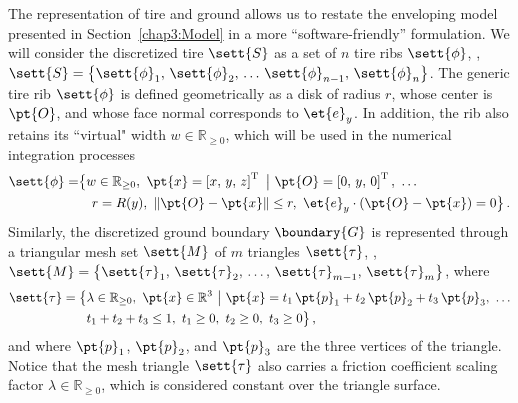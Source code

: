 The representation of tire and ground allows us to restate the enveloping model presented in Section~\ref{chap3:Model} in a more ``software-friendly'' formulation. We will consider the discretized tire $\sett{S}$ as a set of $n$ tire ribs $\sett{\phi}$, \ie{}, $\sett{S} = \big\{ \sett{\phi}_1, \, \sett{\phi}_2, \, \dots \, \sett{\phi}_{n-1}, \, \sett{\phi}_{n}\big\}$. The generic tire rib $\sett{\phi}$ is defined geometrically as a disk of radius $r$, whose center is $\pt{O}$, and whose face normal corresponds to $\et{e}_y$. In addition, the rib also retains its ``virtual" width $w \in \mathbb{R}_{\geq 0}$, which will be used in the numerical integration processes
%
\begin{equation}
  \begin{split}
    \begin{aligned}
      \sett{\phi} =& \big\{ w \in \mathbb{R}_{\geq 0}, ~ \pt{x} = \left[x, \, y, \, z\right]^\mathrm{T} ~ \big\lvert ~ \pt{O} = \left[0, \, y, \, 0\right]^\mathrm{T}, ~ \dots\\
      & \quad r = R(y), ~ \|\pt{O} - \pt{x}\| \leq r, ~ \et{e}_y \cdot (\pt{O} - \pt{x}) = 0\big\}
      \,\text{.}
      \label{chap3:eq:rib}
    \end{aligned}
  \end{split}
\end{equation}
%
Similarly, the discretized ground boundary $\boundary{G}$ is represented through a triangular mesh set $\sett{M}$ of $m$ triangles $\sett{\tau}$, \ie{}, $\sett{M} = \big\{ \sett{\tau}_1, \, \sett{\tau}_2, \, \dots, \, \sett{\tau}_{m-1}, \, \sett{\tau}_m \big\}$, where
%
\begin{equation}
  \begin{split}
    \begin{aligned}
      \sett{\tau} = \big\{ & \lambda\in\mathbb{R}_{\geq 0}, ~ \pt{x}\in\mathbb{R}^3 ~ \big\lvert ~ \pt{x} = t_1\,\pt{p}_1 + t_2\,\pt{p}_2 + t_3\,\pt{p}_3, ~ \dots \\
      &t_1 + t_2 + t_3 \leq 1, ~ t_1\geq 0, ~ t_2\geq 0, ~ t_3\geq 0\big\}\,\text{,}
    \end{aligned}
  \end{split}
  \label{chap3:eq:triangleground}
\end{equation}
%
and where $\pt{p}_1$, $\pt{p}_2$, and $\pt{p}_3$ are the three vertices of the triangle. Notice that the mesh triangle $\sett{\tau}$ also carries a friction coefficient scaling factor $\lambda\in\mathbb{R}_{\geq 0}$, which is considered constant over the triangle surface.

